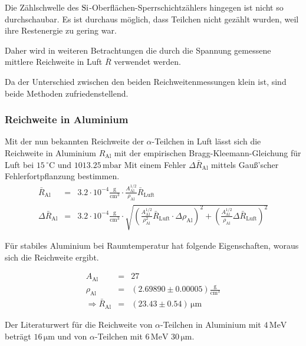 \documentclass[12pt,a4paper]{scrartcl}
\numberwithin{equation}{section} %
\begin{document}
Die Zählschwelle des $\ce{Si}$-Oberflächen-Sperrschichtzählers hingegen ist nicht so durchschaubar. Es ist durchaus möglich, dass Teilchen nicht gezählt wurden, weil ihre Restenergie zu gering war.

Daher wird in weiteren Betrachtungen die durch die Spannung gemessene mittlere Reichweite in Luft $\bar R$ verwendet werden.

Da der Unterschied zwischen den beiden Reichweitenmessungen klein ist, sind beide Methoden zufriedenstellend.

\hypertarget{Reichweite-Aluminium}{%
	\subsubsection{Reichweite in Aluminium}\label{Reichweite-Aluminium}}

Mit der nun bekannten Reichweite der $\alpha$-Teilchen in Luft lässt sich die Reichweite in Aluminium $R_\mathrm{Al}$ mit der empirischen Bragg-Kleemann-Gleichung für Luft bei $15\mathrm{\,^\circ C}$ und $1013.25 \mathrm{\, mbar}$ Mit einem Fehler $\Delta \bar{R}_\mathrm{Al}$ mittels Gauß'scher Fehlerfortpflanzung bestimmen.
\begin{eqnarray}
	\bar{R}_\mathrm{Al} &=& 3.2 \cdot 10^{-4} \mathrm{\frac{g}{cm^3}}
		\cdot \frac{A_\mathrm{Al}^{1/2}}{\rho_\mathrm{Al}} \bar{R}_\mathrm{Luft} \\
	\Delta \bar{R}_\mathrm{Al} &=& 3.2 \cdot 10^{-4} \mathrm{\frac{g}{cm^3}} \cdot
		\sqrt{
				\left(\frac{A_\mathrm{Al}^{1/2}}{\rho_\mathrm{Al}^2}\bar{R}_\mathrm{Luft} \cdot \Delta \rho_\mathrm{Al} \right)^2
				+ \left( \frac{A_\mathrm{Al}^{1/2}}{\rho_\mathrm{Al}} \Delta \bar{R}_\mathrm{Luft}\right)^2
		}
\end{eqnarray}

Für stabiles Aluminium bei Raumtemperatur hat folgende Eigenschaften, \cite{NIST_Al} woraus sich die Reichweite ergibt.

\begin{eqnarray}
	A_\mathrm{Al} &=& 27 \\
	\rho_\mathrm{Al} &=& (2.69890 \pm 0.00005) \mathrm{\frac{g}{cm^3}} \\
	\Rightarrow \bar{R}_\mathrm{Al} &=& (23.43 \pm 0.54) \mathrm{\, \mu m}
\end{eqnarray}

Der Literaturwert für die Reichweite von $\alpha$-Teilchen in Aluminium mit $4 \mathrm{\, MeV}$ beträgt $16 \mathrm{\, \mu m}$ und von $\alpha$-Teilchen mit $6 \mathrm{\, MeV}$ $30 \mathrm{\, \mu m}$. \cite{LEIFIphysik Alphazerfall }
\end{document}
